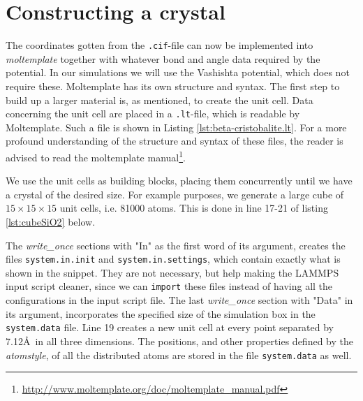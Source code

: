 \documentclass[twoside,english]{uiofysmaster}
\begin{document}
\section{Constructing a crystal}
The coordinates gotten from the \texttt{.cif}-file can now be implemented into \textit{moltemplate} together with whatever bond and angle data required by the potential. In our simulations we will use the Vashishta potential, which does not require these. 
Moltemplate has its own structure and syntax. 
The first step to build up a larger material is, as mentioned, to create the unit cell. 
Data concerning the unit cell are placed in a \texttt{.lt}-file, which is readable by Moltemplate. 
Such a file is shown in Listing \ref{lst:beta-cristobalite.lt}. 
For a more profound understanding of the structure and syntax of these files, the reader is advised to read the moltemplate manual\footnote{\url{http://www.moltemplate.org/doc/moltemplate_manual.pdf}}.



We use the unit cells as building blocks, placing them concurrently until we have a crystal of the desired size. For example purposes, we generate a large cube of $15\times15\times15$ unit cells, i.e. 81000 atoms. This is done in line 17-21 of listing \ref{lst:cubeSiO2} below.

The \textit{write\_once} sections with "In" as the first word of its argument, creates the files \texttt{system.in.init} and \texttt{system.in.settings}, which contain exactly what is shown in the snippet. 
They are not necessary, but help making the LAMMPS input script cleaner, since we can \texttt{import} these files instead of having all the configurations in the input script file.
The last \textit{write\_once} section with "Data" in its argument, incorporates the specified size of the simulation box in the \texttt{system.data} file. 
Line 19 creates a new unit cell at every point separated by 7.12\AA ~in all three dimensions. The positions, and other properties defined by the \textit{atomstyle}, of all the distributed atoms are stored in the file \texttt{system.data} as well. 
\end{document}
